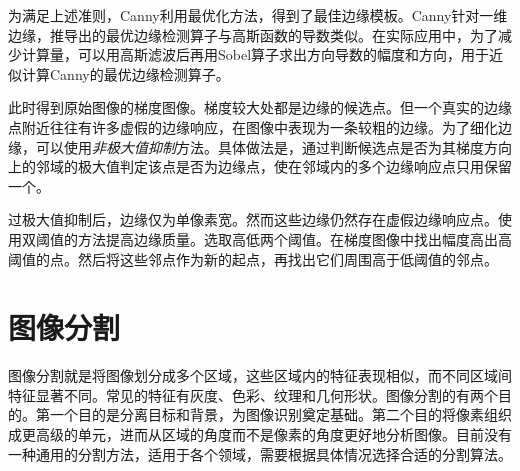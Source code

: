 为满足上述准则，Canny利用最优化方法，得到了最佳边缘模板。Canny针对一维边缘，推导出的最优边缘检测算子与高斯函数的导数类似。在实际应用中，为了减少计算量，可以用高斯滤波后再用Sobel算子求出方向导数的幅度和方向，用于近似计算Canny的最优边缘检测算子。

此时得到原始图像的梯度图像。梯度较大处都是边缘的候选点。但一个真实的边缘点附近往往有许多虚假的边缘响应，在图像中表现为一条较粗的边缘。为了细化边缘，可以使用\emph{非极大值抑制}方法。具体做法是，通过判断候选点是否为其梯度方向上的邻域的极大值判定该点是否为边缘点，使在邻域内的多个边缘响应点只用保留一个。%

过极大值抑制后，边缘仅为单像素宽。然而这些边缘仍然存在虚假边缘响应点。使用双阈值的方法提高边缘质量。选取高低两个阈值。在梯度图像中找出幅度高出高阈值的点。然后将这些邻点作为新的起点，再找出它们周围高于低阈值的邻点。

\section{图像分割}

图像分割就是将图像划分成多个区域，这些区域内的特征表现相似，而不同区域间特征显著不同。常见的特征有灰度、色彩、纹理和几何形状。图像分割的有两个目的。第一个目的是分离目标和背景，为图像识别奠定基础。第二个目的将像素组织成更高级的单元，进而从区域的角度而不是像素的角度更好地分析图像。目前没有一种通用的分割方法，适用于各个领域，需要根据具体情况选择合适的分割算法。

